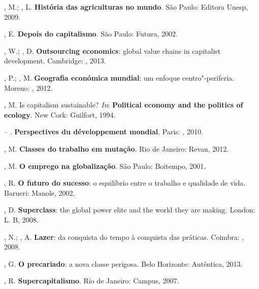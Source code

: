 , M.; , L. \textbf{História das agriculturas no mundo}.
São Paulo: Editora Unesp, 2009.

, E. \textbf{Depois do capitalismo}. São Paulo: Futura, 2002.

, W.; , D. \textbf{Outsourcing economics}: global value
chains in capitalist development. Cambridge: , 2013.

, P.; , M. \textbf{Geografia económica mundial}: um
enfoque centro"-periferia. Moreno: , 2012.

, M. Is capitalism sustainable? \emph{In}: \textbf{Political
economy and the politics of ecology}. New Cork: Guilfort, 1994.

 -- .
\textbf{Perspectives du développement mondial}. Paris: , 2010.

, M. \textbf{Classes do trabalho em mutação}. Rio de Janeiro:
Revan, 2012.

, M. \textbf{O emprego na globalização}. São Paulo: Boitempo,
2001.

, R. \textbf{O futuro do sucesso}: o equilíbrio entre o trabalho e
qualidade de vida. Barueri: Manole, 2002.

, D. \textbf{Superclass}: the global power elite and the world
they are making. London: L. B, 2008.

, N.; , A. \textbf{Lazer}: da conquista do tempo à conquista
das práticas. Coimbra: , 2008.

, G. \textbf{O precariado}: a nova classe perigosa. Belo
Horizonte: Autêntica, 2013.

, R. \textbf{Supercapitalismo}. Rio de Janeiro: Campus, 2007.

